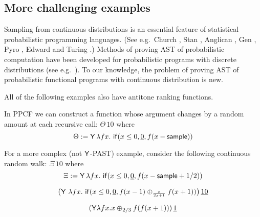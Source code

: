 \subsection{More challenging examples} 

Sampling from continuous distributions is an essential feature of statistical probabilistic programming languages. (See e.g.~Church \citep{DBLP:conf/uai/GoodmanMRBT08}, Stan \citep{carpenter2017stan}, Anglican \citep{DBLP:conf/pkdd/TolpinMW15}, Gen \citep{cusumano-towner2019Gen}, Pyro \citep{bingham2019Pyro}, Edward \citep{tran2016edward} and Turing \citep{ge2018Turing}.)
Methods of proving AST of probabilistic computation have been developed for probabilistic programs with discrete distributions (see e.g.~\cite{DBLP:journals/toplas/LagoG19,DBLP:journals/jacm/KaminskiKMO18,DBLP:conf/lics/OlmedoKKM16,DBLP:conf/lics/KobayashiLG19,DBLP:conf/mfcs/KaminskiK15,DBLP:series/mcs/McIverM05}).
To our knowledge, the problem of proving AST of probabilistic functional programs with continuous distribution is new.

All of the following examples also have antitone ranking functions.

\iffalse
\begin{example}\label{ex:raven complex}
In PPCF we can construct a function whose argument changes by a random amount at each recursive call: $\Theta \, \underline{10}$ where
\[
\Theta := \mathsf{Y} \, \lambda f x .\ \mathsf{if}(x \leq 0, \underline 0, f(x - \mathsf{sample}))
\]

For a more complex (not $\mathsf{Y}$-PAST) example, consider the following continuous random walk: $\Xi \, \underline{10}$ where
\[
\Xi := \mathsf{Y} \, \lambda f x .\ \mathsf{if}(x \leq 0, \underline 0, f(x - \mathsf{sample} + 1/2)) 
\]
\end{example}

\begin{example}
\label{ex:Fair-in-the-limit random walk}\cite[\S 5.3]{DBLP:journals/pacmpl/McIverMKK18}
\[
\big
(\tY\ \lambda f x .\ 
\tif{x \leq 0}{\underline 0}{f(x - 1) \oplus_{\frac{x}{2x+1}} f(x + 1)} \big)
\, \underline{10}
\]
\end{example}

\begin{example}
\label{ex:non-affine recursion easy}
\[
(\mathsf{Y} \lambda f x. x \oplus_{2/3} f (f (x + 1)))\, \underline 1
\]
\end{example}

